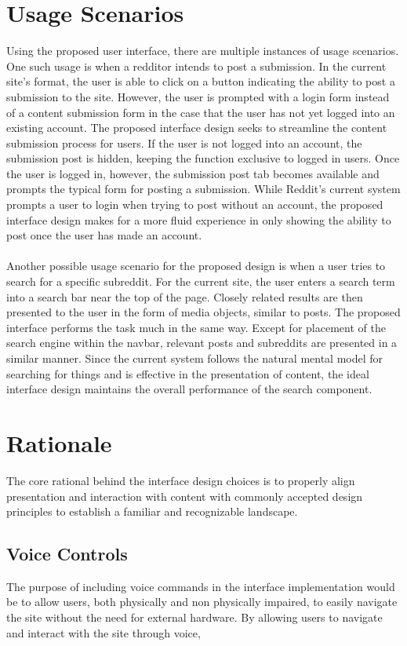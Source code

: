 \documentclass{article}
\begin{document}
\section{Usage Scenarios} Using the proposed user interface, there are multiple instances of usage scenarios. One such usage is when a redditor intends to post a submission. In the current site's format, the user is able to click on a button indicating the ability to post a submission to the site. However, the user is prompted with a login form instead of a content submission form in the case that the user has not yet logged into an existing account. The proposed interface design seeks to streamline the content submission process for users. If the user is not logged into an account, the submission post is hidden, keeping the function exclusive to logged in users. Once the user is logged in, however, the submission post tab becomes available and prompts the typical form for posting a submission. While Reddit's current system prompts a user to login when trying to post without an account, the proposed interface design makes for a more fluid experience in only showing the ability to post once the user has made an account.\\
\\
\indent Another possible usage scenario for the proposed design is when a user tries to search for a specific subreddit. For the current site, the user enters a search term into a search bar near the top of the page. Closely related results are then presented to the user in the form of media objects, similar to posts. The proposed interface performs the task much in the same way. Except for placement of the search engine within the navbar, relevant posts and subreddits are presented in a similar manner. Since the current system follows the natural mental model for searching for things and is effective in the presentation of content, the ideal interface design maintains the overall performance of the search component.

\section{Rationale} The core rational behind the interface design choices is to properly align presentation and interaction with content with commonly accepted design principles to establish a familiar and recognizable landscape.

\subsection{Voice Controls} The purpose of including voice commands in the interface implementation would be to allow users, both physically and non physically impaired, to easily navigate the site without the need for external hardware. By allowing users to navigate and interact with the site through voice, 
\end{document}
